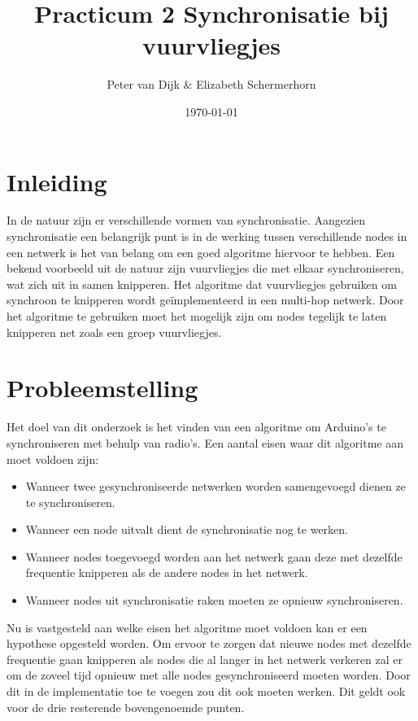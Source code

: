 \documentclass{article}
\author{Peter van Dijk \& Elizabeth Schermerhorn}
\date{\today}
\title{Practicum 2 Synchronisatie bij vuurvliegjes}
\begin{document}
\maketitle
\newpage
\tableofcontents
\clearpage
\section{Inleiding}
In de natuur zijn er verschillende vormen van synchronisatie. Aangezien synchronisatie een belangrijk punt is in de werking tussen verschillende nodes in een netwerk is het van belang om een goed algoritme hiervoor te hebben. Een bekend voorbeeld uit de natuur zijn vuurvliegjes die met elkaar synchroniseren, wat zich uit in samen knipperen. Het algoritme dat vuurvliegjes gebruiken om synchroon te knipperen wordt ge\"{i}mplementeerd in een multi-hop netwerk. Door het algoritme te gebruiken moet het mogelijk zijn om nodes tegelijk te laten knipperen net zoals een groep vuurvliegjes. 
\section{Probleemstelling}
Het doel van dit onderzoek is het vinden van een algoritme om Arduino's te synchroniseren met behulp van radio's. Een aantal eisen waar dit algoritme aan moet voldoen zijn:
 \begin{itemize}
 \item Wanneer twee gesynchroniseerde netwerken worden samengevoegd dienen ze te synchroniseren.
 \item Wanneer een node uitvalt dient de synchronisatie nog te werken.
 \item Wanneer nodes toegevoegd worden aan het netwerk gaan deze met dezelfde frequentie knipperen als de andere nodes in het netwerk.
 \item Wanneer nodes uit synchronisatie raken moeten ze opnieuw synchroniseren. 
 \end{itemize}
Nu is vastgesteld aan welke eisen het algoritme moet voldoen kan er een hypothese opgesteld worden. Om ervoor te zorgen dat nieuwe nodes met dezelfde frequentie gaan knipperen als nodes die al langer in het netwerk verkeren zal er om de zoveel tijd opnieuw met alle nodes gesynchroniseerd moeten worden. Door dit in de implementatie toe te voegen zou dit ook moeten werken. Dit geldt ook voor de drie resterende bovengenoemde punten. 
\end{document}
